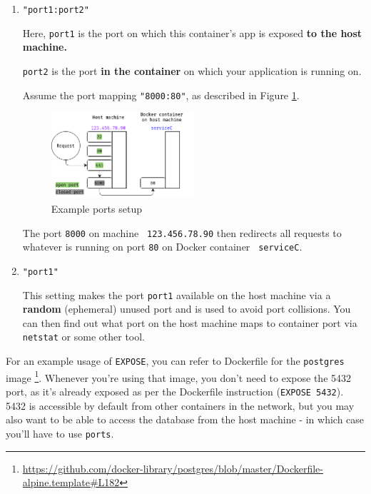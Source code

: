 \documentclass{article}
\newcommand{\flink}[1]{\footnote{\href{#1}{#1}}}
\newcommand{\dockerinline}[1]{\lstinline[language=docker, style=cstyle, basicstyle=\ttfamily\normalsize]{#1}}
\begin{document}
\begin{enumerate}
    \item{
            \texttt{"port1:port2"}

            Here, \texttt{port1} is the port on which this container's app is exposed \textbf{to the host machine.}

            \texttt{port2} is the port \textbf{in the container} on which your application is running on.

            Assume the port mapping \texttt{"8000:80"}, as described in Figure \ref{preparations:dockerports_pic}.

            \begin{figure}[H]
                \centering
                \includegraphics[width=0.5\textwidth]{img/docker_ports.png}
                \caption{Example ports setup}
                \label{preparations:dockerports_pic}
            \end{figure}

            The port \texttt{8000} on machine \texttt{\color[HTML]{9933FF} 123.456.78.90} then redirects all requests to whatever is running on port \texttt{80} on Docker container \texttt{\color[HTML]{3333FF} serviceC}.
        }
    \item{
            \texttt{"port1"}

            This setting makes the port \texttt{port1} available on the host machine via a \textbf{random} (ephemeral) unused port and is used to avoid port collisions. You can then find out what port on the host machine maps to container port via \texttt{netstat} or some other tool.
        }
\end{enumerate}

For an example usage of \dockerinline{EXPOSE}, you can refer to Dockerfile for the \texttt{postgres} image \flink{https://github.com/docker-library/postgres/blob/master/Dockerfile-alpine.template\#L182}. Whenever you're using that image, you don't need to expose the 5432 port, as it's already exposed as per the Dockerfile instruction (\dockerinline{EXPOSE 5432}). 5432 is accessible by default from other containers in the network, but you may also want to be able to access the database from the host machine - in which case you'll have to use \dockerinline{ports}.
\end{document}
